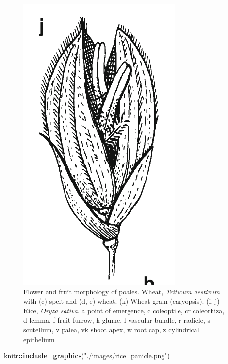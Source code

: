 \documentclass[]{article}
\newenvironment{Shaded}{\begin{snugshade}}{\end{snugshade}}
\newcommand{\KeywordTok}[1]{\textcolor[rgb]{0.13,0.29,0.53}{\textbf{#1}}}
\newcommand{\NormalTok}[1]{#1}
\newcommand{\OperatorTok}[1]{\textcolor[rgb]{0.81,0.36,0.00}{\textbf{#1}}}
\newcommand{\StringTok}[1]{\textcolor[rgb]{0.31,0.60,0.02}{#1}}
\begin{document}
\begin{figure}

{\centering \includegraphics[width=0.8\linewidth]{./images/rice_floret} 

}

\caption{Flower and fruit morphology of poales. Wheat, \textit{Triticum aestivum} with (c) spelt and (d, e) wheat. (k) Wheat grain (caryopsis). (i, j) Rice, \textit{Oryza sativa}. a point of emergence, c coleoptile, cr coleorhiza, d lemma, f fruit furrow, h glume, l vascular bundle, r radicle, s scutellum, v palea, vk shoot apex, w root cap, z cylindrical epithelium}\label{fig:floral-morphology-poales}
\end{figure}

\begin{Shaded}
\begin{Highlighting}[]
\NormalTok{knitr}\OperatorTok{::}\KeywordTok{include_graphics}\NormalTok{(}\StringTok{"./images/rice_panicle.png"}\NormalTok{)}
\end{Highlighting}
\end{Shaded}
\end{document}
